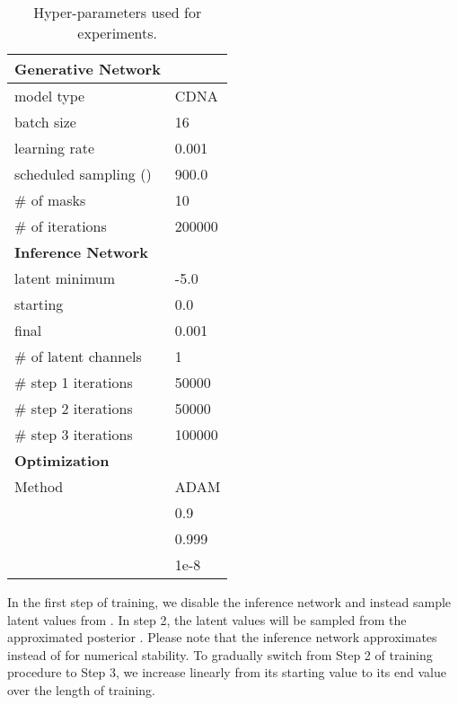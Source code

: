 \documentclass{article} \usepackage{iclr2018_conference,times}
\begin{document}
\begin{table}[h]
\centering
\caption{Hyper-parameters used for experiments.}
\label{tab:hyper}
\begin{tabular}{ll}
\hline
\textbf{Generative Network} &     \\ \hline
model type               & CDNA   \\
batch size               & 16     \\
learning rate            & 0.001  \\
scheduled sampling () & 900.0  \\
\# of masks              & 10     \\
\# of iterations         & 200000 \\ \hline
\textbf{Inference Network} &     \\ \hline
latent minimum   & -5.0   \\
starting          & 0.0    \\
final             & 0.001  \\
\# of latent channels    & 1      \\
\# step 1 iterations     & 50000  \\
\# step 2 iterations     & 50000  \\
\# step 3 iterations     & 100000 \\ \hline
\textbf{Optimization}    &     \\ \hline
Method                   & ADAM \\
                 & 0.9 \\
                 & 0.999 \\
               & 1e-8
\end{tabular}
\end{table}

In the first step of training, we disable the inference network and instead sample latent values from . In step 2, the latent values will be sampled from the approximated posterior . Please note that the inference network approximates  instead of  for numerical stability. To gradually switch from Step 2 of training procedure to Step 3, we increase  linearly from its starting value to its end value over the length of training.  
\end{document}
